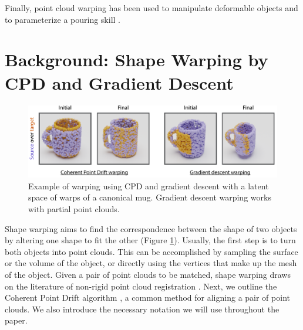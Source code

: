 \documentclass{article}
\newcommand{\rob}[1]{\textcolor{green}{[\textbf{rob:} #1]}}
\begin{document}
Finally, point cloud warping has been used to manipulate deformable objects \cite{lee15learning,schulman16learning} and to parameterize a pouring skill \cite{brandi14generalizing}.



\section{Background: Shape Warping by CPD and Gradient Descent}
\label{sec:background}

\begin{figure}
    \centering
    \includegraphics[width=\textwidth]{figures/warping.pdf}
    \caption{Example of warping using CPD and gradient descent with a latent space of warps of a canonical mug. Gradient descent warping works with partial point clouds.}
    \label{fig:warping}
\end{figure}

Shape warping aims to find the correspondence between the shape of two objects by altering one shape to fit the other (Figure \ref{fig:warping}). Usually, the first step is to turn both objects into point clouds. This can be accomplished by sampling the surface or the volume of the object, or directly using the vertices that make up the mesh of the object. Given a pair of point clouds to be matched, shape warping draws on the literature of non-rigid point cloud registration \cite{huang21comprehensive}. Next, we outline the Coherent Point Drift algorithm \cite{manuelli20keypoints}, a common method for aligning a pair of point clouds. We also introduce the necessary notation we will use throughout the paper.
\end{document}
